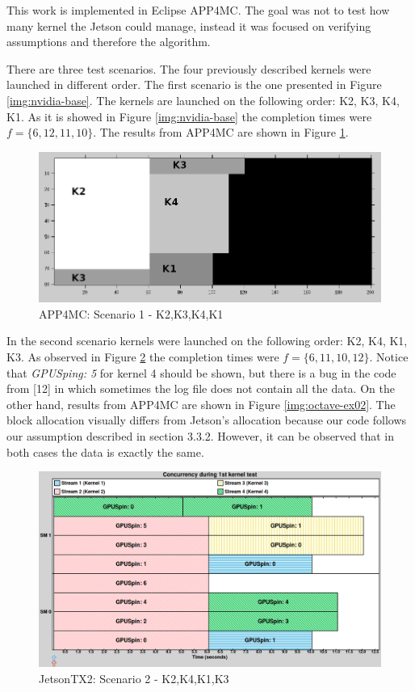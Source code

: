 \documentclass[
  12pt,
  a4paperpaper,
]{report}
\begin{document}
This work is implemented in  Eclipse APP4MC. The goal was not to test
how many kernel the Jetson could manage, instead it was focused on verifying
assumptions and therefore the algorithm.

There are  three test scenarios. The four previously described kernels
were launched in different order. The first scenario is the one
presented in Figure \ref{img:nvidia-base}. The kernels are launched on
the following order: K2, K3, K4, K1. As it is showed in Figure
\ref{img:nvidia-base} the completion times were \(f = \{6, 12,11,10\}\).
The results from APP4MC are shown in Figure \ref{img:octave-base}.

\begin{figure}
\centering
\includegraphics[width=1\textwidth,height=\textheight]{source/figures/octave/base.png}
\caption{APP4MC: Scenario 1 - K2,K3,K4,K1 \label{img:octave-base}}
\end{figure}

In the second scenario kernels were launched on the following order: K2,
K4, K1, K3. As observed in Figure \ref{img:nvidia-ex02} the completion
times were \(f = \{6,11,10,12\}\). Notice that \emph{GPUSping: 5} for
kernel 4 should be shown, but there is a bug in the code from {[}12{]}
in which sometimes the log file does not contain all the data. On the
other hand, results from APP4MC are shown in Figure
\ref{img:octave-ex02}. The block allocation visually differs from Jetson's
allocation because our code follows our assumption described in section
3.3.2. However, it can be observed that in both cases the data is exactly the same.  

\begin{figure}
\centering
\includegraphics[width=1\textwidth,height=\textheight]{source/figures/nvidia/ex02.png}
\caption{JetsonTX2: Scenario 2 - K2,K4,K1,K3 \label{img:nvidia-ex02}}
\end{figure}
\end{document}
